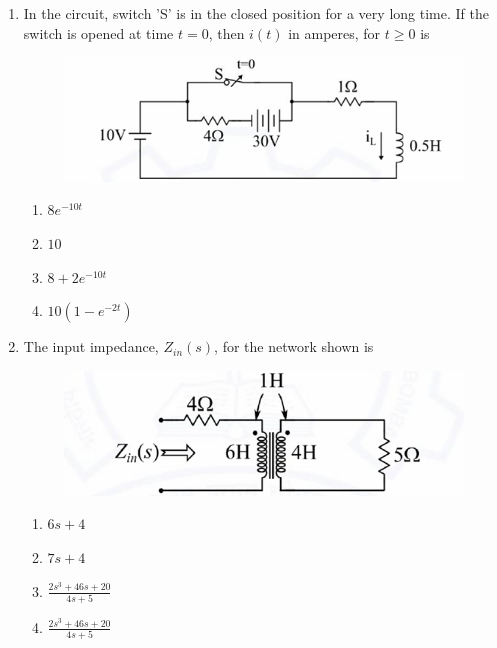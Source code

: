 \documentclass[journal,12pt,onecolumn]{IEEEtran}
\theoremstyle{remark}
\begin{document}
\begin{flushleft}
\begin{enumerate}
\begin{enumerate}
\end{enumerate}





\item In the circuit, switch 'S' is in the closed position for a very long time. 
If the switch is opened at time $t=0$, then $i(t)$ in amperes, for $t \geq 0$ is


\begin{figure}[H]
    \centering
    \includegraphics[width=0.5\columnwidth]{figs/39.png}
    \caption{}
    \label{fig:placeholder}
\end{figure}

\begin{multicols}{2}
\begin{enumerate}
    \item $8e^{-10t}$
    \item $10$
    \item $8+2e^{-10t}$
    \item $10(1-e^{-2t})$
\end{enumerate}
\end{multicols}


\item The input impedance, $Z_{in}(s)$, for the network shown is


\begin{figure}[H]
    \centering
    \includegraphics[width=0.5\columnwidth]{figs/40.png}
    \caption{}
    \label{fig:placeholder}
\end{figure}
\begin{multicols}{2}
\begin{enumerate}
    \item $6s+4$
    \item $7s+4$
    \item $\frac{2s^3+46s+20}{4s+5}$
    \item $\frac{2s^3+46s+20}{4s+5}$
\end{enumerate}
\end{multicols}


\end{enumerate}
\end{flushleft}
\end{document}
